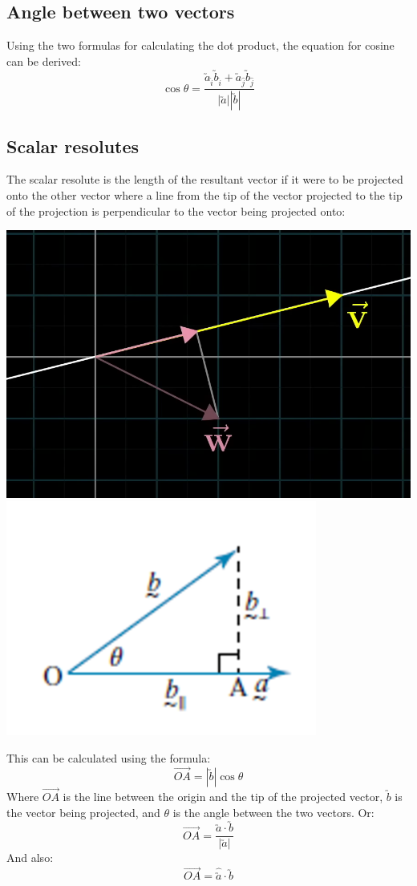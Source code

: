 \documentclass[a4paper,10pt]{report}
\begin{document}
\subsection{Angle between two vectors}
Using the two formulas for calculating the dot product, the equation for cosine can be derived:
$$
	\cos\theta = \frac{\utilde{a}_{\hat{i}} \utilde{b}_{\hat{i}} + \utilde{a}_{\hat{j}} \utilde{b}_{\hat{j}}}{|\utilde{a}||\utilde{b}|}
$$

\subsection{Scalar resolutes}
The scalar resolute is the length of the resultant vector if it were to be projected onto the other vector where a line from the tip of the vector projected to the tip of the projection is perpendicular to the vector being projected onto:
\begin{center}
	\includegraphics[scale=0.5]{dot product explination}
	\includegraphics[scale=0.5]{dot product explination 2}
\end{center}
This can be calculated using the formula:
$$
	\Vec{OA} = |\utilde{b}|\cos\theta
$$
Where $\Vec{OA}$ is the line between the origin and the tip of the projected vector, $\utilde{b}$ is the vector being projected, and $\theta$ is the angle between the two vectors.  Or:
$$
	\Vec{OA} = \frac{\utilde{a} \cdot \utilde{b}}{|\utilde{a}|}
$$
And also:
$$
	\Vec{OA} = \hat{\utilde{a}} \cdot \utilde{b}
$$
\end{document}
